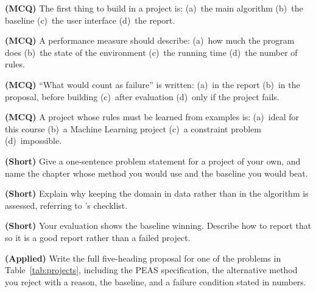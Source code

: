 \begin{reviewq}
  \item \textbf{(MCQ)} The first thing to build in a project is:
        (a)~the main algorithm (b)~the baseline (c)~the user interface
        (d)~the report.
  \item \textbf{(MCQ)} A performance measure should describe:
        (a)~how much the program does (b)~the state of the environment
        (c)~the running time (d)~the number of rules.
  \item \textbf{(MCQ)} ``What would count as failure'' is written:
        (a)~in the report (b)~in the proposal, before building
        (c)~after evaluation (d)~only if the project fails.
  \item \textbf{(MCQ)} A project whose rules must be learned from examples is:
        (a)~ideal for this course (b)~a Machine Learning project
        (c)~a constraint problem (d)~impossible.
  \item \textbf{(Short)} Give a one-sentence problem statement for a project of
        your own, and name the chapter whose method you would use and the baseline
        you would beat.
  \item \textbf{(Short)} Explain why keeping the domain in data rather than in the
        algorithm is assessed, referring to 's checklist.
  \item \textbf{(Short)} Your evaluation shows the baseline winning. Describe how to
        report that so it is a good report rather than a failed project.
  \item \textbf{(Applied)} Write the full five-heading proposal for one of the
        problems in Table~\ref{tab:projects}, including the PEAS specification, the
        alternative method you reject with a reason, the baseline, and a failure
        condition stated in numbers.
\end{reviewq}
